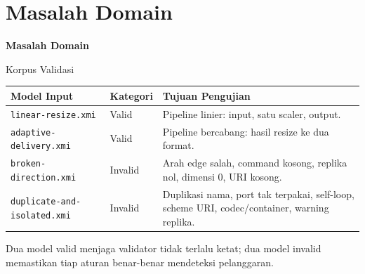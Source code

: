 \documentclass[aspectratio=169, table]{beamer}
\begin{document}
\section{Masalah Domain}
\begin{frame}{\hfill}
	\centering
	\Huge{\textbf{Masalah Domain}}
\end{frame}

\begin{frame}{Korpus Validasi}
\vspace{2pt}
\scriptsize
\begin{tabular}{|p{}|p{}|p{}|}
\hline
\rowcolor{black!8}
\textbf{Model Input} & \textbf{Kategori} & \textbf{Tujuan Pengujian} \\
\hline
\texttt{linear-resize.xmi} & Valid & Pipeline linier: input, satu scaler, output. \\
\hline
\texttt{adaptive-delivery.xmi} & Valid & Pipeline bercabang: hasil resize ke dua format. \\
\hline
\texttt{broken-direction.xmi} & Invalid & Arah edge salah, command kosong, replika nol, dimensi 0, URI kosong. \\
\hline
\texttt{duplicate-and-isolated.xmi} & Invalid & Duplikasi nama, port tak terpakai, self-loop, scheme URI, codec/container, warning replika. \\
\hline
\end{tabular}

\vspace{8pt}
\small
Dua model valid menjaga validator tidak terlalu ketat; dua model invalid memastikan tiap aturan benar-benar mendeteksi pelanggaran.
\end{frame}
\end{document}
